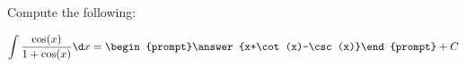 \documentclass{ximera}
\author{Jim Talamo}
\begin{document}
\begin{exercise}
Compute the following:

\[
\int \frac{\cos(x)}{1+\cos(x)} \d x =
\begin{prompt}\answer{x+\cot(x)-\csc(x)}\end{prompt}+C \\
\]

\end{exercise}
\end{document}
